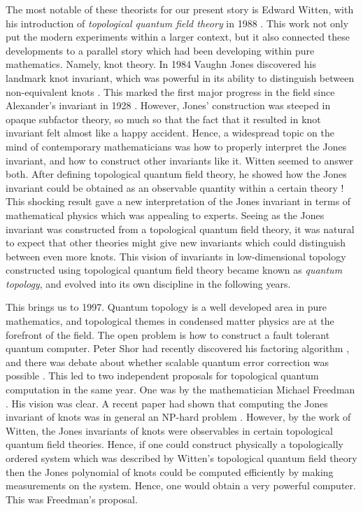 \documentclass{article}
\theoremstyle{definition}
\numberwithin{figure}{section}
\begin{document}
The most notable of these theorists for our present story is Edward Witten, with his introduction of \textit{topological quantum field theory} in 1988 \cite{witten1988topological}. This work not only put the modern experiments within a larger context, but it also connected these developments to a parallel story which had been developing within pure mathematics. Namely, knot theory. In 1984 Vaughn Jones discovered his landmark knot invariant, which was powerful in its ability to distinguish between non-equivalent knots \cite{jones1997polynomial}. This marked the first major progress in the field since Alexander's invariant in 1928 \cite{alexander1928topological}. However, Jones’ construction was steeped in opaque subfactor theory, so much so that the fact that it resulted in knot invariant felt almost like a happy accident. Hence, a widespread topic on the mind of contemporary mathematicians was how to properly interpret the Jones invariant, and how to construct other invariants like it. Witten seemed to answer both. After defining topological quantum field theory, he showed how the Jones invariant could be obtained as an observable quantity within a certain theory \cite{witten1989quantum}! This shocking result gave a new interpretation of the Jones invariant in terms of mathematical physics which was appealing to experts. Seeing as the Jones invariant was constructed from a topological quantum field theory, it was natural to expect that other theories might give new invariants which could distinguish between even more knots. This vision of invariants in low-dimensional topology constructed using topological quantum field theory became known as \textit{quantum topology}, and evolved into its own discipline in the following years.

This brings us to 1997. Quantum topology is a well developed area in pure mathematics, and topological themes in condensed matter physics are at the forefront of the field. The open problem is how to construct a fault tolerant quantum computer. Peter Shor had recently discovered his factoring algorithm \cite{shor1994algorithms}, and there was debate about whether scalable quantum error correction was possible \cite{landauer1995quantum}. This led to two independent proposals for topological quantum computation in the same year. One was by the mathematician Michael Freedman \cite{freedman1998p}. His vision was clear. A recent paper had shown that computing the Jones invariant of knots was in general an NP-hard problem \cite{jaeger1990computational}. However, by the work of Witten, the Jones invariants of knots were observables in certain topological quantum field theories. Hence, if one could construct physically a topologically ordered system which was described by Witten’s topological quantum field theory then the Jones polynomial of knots could be computed efficiently by making measurements on the system. Hence, one would obtain a very powerful computer. This was Freedman’s proposal.
\end{document}
